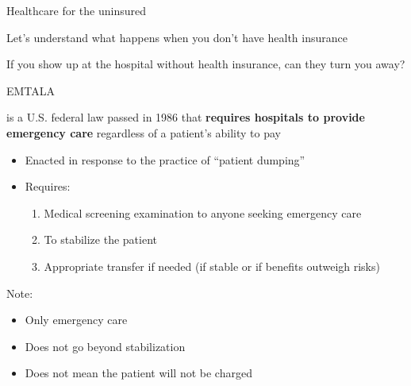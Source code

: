 \begin{frame}{Healthcare for the uninsured}

    Let's understand what happens when you don't have health insurance

    \vspace{7mm}

    If you show up at the hospital without health insurance, can they turn you away?\\

\end{frame}
\begin{frame}{EMTALA}

     is a U.S. federal law passed in 1986 that \textbf{requires hospitals to provide emergency care} regardless of a patient's ability to pay
    \begin{itemize}
        \item Enacted in response to the practice of ``patient dumping''
        \item Requires:
        \begin{enumerate}
            \item Medical screening examination to anyone seeking emergency care
            \item To stabilize the patient
            \item Appropriate transfer if needed (if stable or if benefits outweigh risks)
        \end{enumerate}
    \end{itemize}
    \vspace{3mm}


    Note:
    \begin{itemize}
        \item Only emergency care
        \item Does not go beyond stabilization
        \item Does not mean the patient will not be charged
    \end{itemize}


\end{frame}
